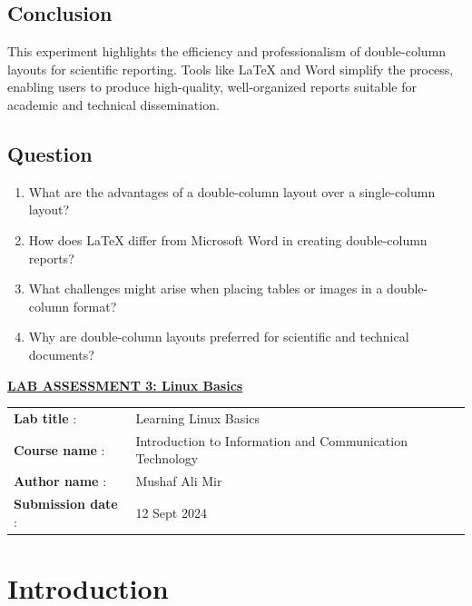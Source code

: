 \documentclass[a4paper,9pt]{article}
\begin{document}
\subsection{Conclusion}
This experiment highlights the efficiency and professionalism of double-column layouts for scientific reporting. Tools like LaTeX and Word simplify the process, enabling users to produce high-quality, well-organized reports suitable for academic and technical dissemination.

\subsection{Question}

\begin{enumerate}
	\item What are the advantages of a double-column layout over a single-column layout?
	\item How does LaTeX differ from Microsoft Word in creating double-column reports? 
	\item What challenges might arise when placing tables or images in a double-column format?
	\item Why are double-column layouts preferred for scientific and technical documents?
	
\end{enumerate}

\newpage	


\begin{center}
	{\Huge \bfseries \underline{ LAB ASSESSMENT 3: Linux Basics} \par}
\end{center}
\noindent\begin{tabular}{@{}ll}
	\textbf{Lab title} :& Learning Linux Basics\\
	\textbf{Course name} :&  Introduction to Information and Communication Technology\\
	\textbf{Author name} : & Mushaf Ali Mir\\
	\textbf{Submission date} :& 12 Sept 2024 \\
\end{tabular}

\section*{Introduction}
\setcounter{section}{3}
\setcounter{figure}{0}  %
\setcounter{subsection}{0}
\end{document}

